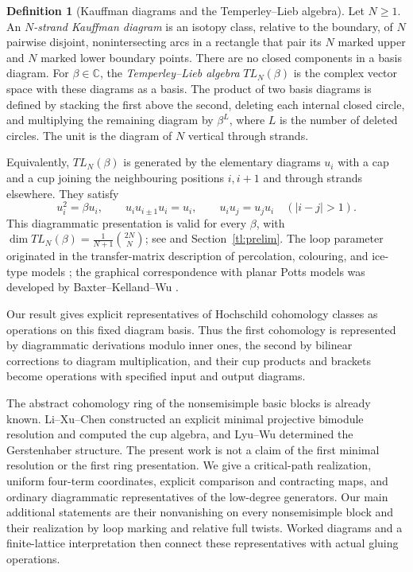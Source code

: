 \documentclass[a4paper,11pt,oneside,reqno]{amsart}
\theoremstyle{definition}
\newtheorem{definition}[theorem]{Definition}
\numberwithin{equation}{section}
\begin{document}
\begin{definition}[Kauffman diagrams and the Temperley--Lieb algebra]
Let $N\ge1$. An \emph{$N$-strand Kauffman diagram} is an isotopy class,
relative to the boundary, of $N$ pairwise disjoint, nonintersecting arcs
in a rectangle that pair its $N$ marked upper and $N$ marked lower
boundary points. There are no closed components in a basis diagram.
For $\beta\in\mathbb C$, the \emph{Temperley--Lieb algebra}
$TL_N(\beta)$ is the complex vector space with these diagrams as a
basis. The product of two basis diagrams is defined by stacking the
first above the second, deleting each internal closed circle, and
multiplying the remaining diagram by $\beta^L$, where $L$ is the
number of deleted circles. The unit is the diagram of $N$ vertical
through strands.
\end{definition}
Equivalently, $TL_N(\beta)$ is generated by the elementary diagrams
$u_i$ with a cap and a cup joining the neighbouring positions
$i,i+1$ and through strands elsewhere. They satisfy
\begin{equation}\label{tl:relations}
 u_i^2=\beta u_i,\qquad u_iu_{i\pm1}u_i=u_i,
 \qquad u_iu_j=u_ju_i\quad(|i-j|>1).
\end{equation}
This diagrammatic presentation is valid for every $\beta$,
with $\dim TL_N(\beta)=\frac1{N+1}\binom{2N}{N}$;
see \cite[Theorem~2.4]{RSA} and Section~\ref{tl:prelim}.
The loop parameter originated in the transfer-matrix description
of percolation, colouring, and ice-type models \cite{TemperleyLieb};
the graphical correspondence with planar Potts models was developed
by Baxter--Kelland--Wu \cite{BKW}.

Our result gives explicit representatives of Hochschild cohomology
classes as operations on this fixed diagram basis. Thus the first
cohomology is represented by diagrammatic derivations modulo inner
ones, the second by bilinear corrections to diagram multiplication,
and their cup products and brackets become operations with specified
input and output diagrams.

The abstract cohomology ring of the nonsemisimple basic blocks is already
known. Li--Xu--Chen \cite{LiXuChen} constructed an explicit minimal
projective bimodule resolution and computed the cup algebra, and
Lyu--Wu \cite{LyuWu} determined the Gerstenhaber structure.
The present work is not a claim of the first minimal resolution or the
first ring presentation. We give a critical-path realization, uniform
four-term coordinates, explicit comparison and contracting maps, and
ordinary diagrammatic representatives of the low-degree generators.
Our main additional statements are their nonvanishing on every
nonsemisimple block and their realization by loop marking and relative
full twists. Worked diagrams and a finite-lattice interpretation then
connect these representatives with actual gluing operations.
\end{document}
